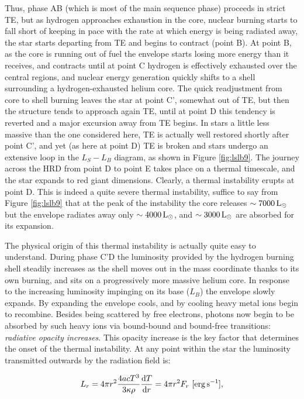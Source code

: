 \documentclass[a4paper,10pt]{article}
\begin{document}
{\noindent}Thus, phase AB (which is most of the main sequence phase) proceeds in strict TE, but as hydrogen approaches exhaustion in the core, nuclear burning starts to fall short of keeping in pace with the rate at which energy is being radiated away, the star starts departing from TE and begins to contract (point B). At point B, as the core is running out of fuel the envelope starts losing more energy than it receives, and contracts until at point C hydrogen is effectively exhausted over the central regions, and nuclear energy generation quickly shifts to a shell surrounding a hydrogen-exhausted helium core. The quick readjustment from core to shell burning leaves the star at point C', somewhat out of TE, but then the structure tends to approach again TE, until at point D this tendency is reverted and a major excursion away from TE begins. In stars a little less massive than the one considered here, TE is actually well restored shortly after point C', and yet (as here at point D) TE is broken and stars undergo an extensive loop in the $L_S-L_B$ diagram, as shown in Figure \ref{fig:lslb9}. The journey across the HRD from point D to point E takes place on a thermal timescale, and the star expands to red giant dimensions. Clearly, a thermal instability erupts at point D. This is indeed a quite severe thermal instability, suffice to say from Figure \ref{fig:lslb9} that at the peak of the instability the core releases $\sim7000\,{\rm L_\odot}$ but the envelope radiates away only $\sim4000\,{\rm L_\odot}$, and $\sim3000\,{\rm L_\odot}$ are absorbed for its expansion.

{\noindent}The physical origin of this thermal instability is actually quite easy to understand. During phase C'D the luminosity provided by the hydrogen burning shell steadily increases as the shell moves out in the mass coordinate thanks to its own burning, and sits on a progressively more massive helium core. In response to the increasing luminosity impinging on its base ($L_B$) the envelope slowly expands. By expanding the envelope cools, and by cooling heavy metal ions begin to recombine. Besides being scattered by free electrons, photons now begin to be absorbed by such heavy ions via bound-bound and bound-free transitions: \textit{radiative opacity increases}. This opacity increase is the key factor that determines the onset of the thermal instability. At any point within the star the luminosity transmitted outwards by the radiation field is:

\begin{align*}
    L_r = 4\pi r^2 \frac{4acT^3}{3\kappa\rho} \frac{{\rm d}T}{{\rm d}r} = 4\pi r^2F_r ~ [{\rm erg\,s^{-1}}],
\end{align*}
\end{document}
